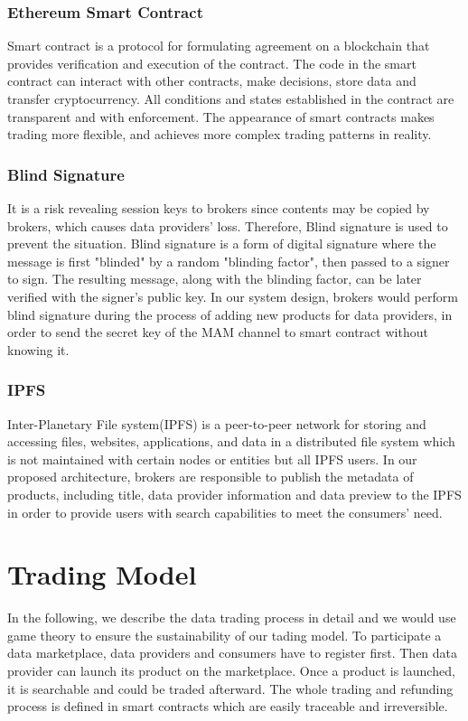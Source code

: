 \documentclass[journal,10pt,a4paper]{IEEEtran}
\begin{document}
\subsubsection{Ethereum Smart Contract}
Smart contract is a protocol for formulating agreement on a blockchain that provides verification and execution of the contract. The code in the smart contract can interact with other contracts, make decisions, store data and transfer cryptocurrency. All conditions and states established in the contract are transparent and with enforcement. The appearance of smart contracts makes trading more flexible, and achieves more complex trading patterns in reality.

\subsubsection{Blind Signature}
 It is a risk revealing session keys to brokers since contents may be copied by brokers, which causes data providers' loss. Therefore, Blind signature is used to prevent the situation. Blind signature\cite{blindSig} is a form of digital signature where the message is first "blinded" by a random "blinding factor", then passed to a signer to sign. The resulting message, along with the blinding factor, can be later verified with the signer's public key. In our system design, brokers would perform blind signature during the process of adding new products for data providers, in order to send the secret key of the MAM channel to smart contract without knowing it.

\subsubsection{IPFS}
Inter-Planetary File system(IPFS)\cite{IPFS} is a peer-to-peer network for storing and accessing files, websites, applications, and data in a distributed file system which is not maintained with certain nodes or entities but all IPFS users. In our proposed architecture, brokers are responsible to publish the metadata of products, including title, data provider information and data preview to the IPFS in order to provide users with search capabilities to meet the consumers' need.

\section{\normalsize\textbf{Trading Model}}
In the following, we describe the data trading process in detail and we would use game theory to ensure the sustainability of our tading model. To participate a data marketplace, data providers and consumers have to register first. Then data provider can launch its product on the marketplace. Once a product is launched, it is searchable and could be traded afterward. The whole trading and refunding process is defined in smart contracts which are easily traceable and irreversible.
\end{document}
